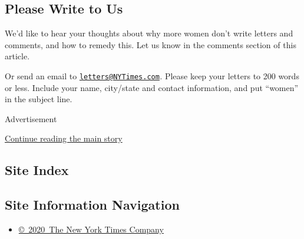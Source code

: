 \hypertarget{please-write-to-us}{%
\subsection{Please Write to Us}\label{please-write-to-us}}

We'd like to hear your thoughts about why more women don't write letters
and comments, and how to remedy this. Let us know in the comments
section of this article.

Or send an email to
\href{mailto:letters@NYTimes.com}{\nolinkurl{letters@NYTimes.com}}\emph{.}
Please keep your letters to 200 words or less. Include your name,
city/state and contact information, and put ``women'' in the subject
line.

Advertisement

\protect\hyperlink{after-bottom}{Continue reading the main story}

\hypertarget{site-index}{%
\subsection{Site Index}\label{site-index}}

\hypertarget{site-information-navigation}{%
\subsection{Site Information
Navigation}\label{site-information-navigation}}

\begin{itemize}
\tightlist
\item
  \href{https://help.nytimes3xbfgragh.onion/hc/en-us/articles/115014792127-Copyright-notice}{©~2020~The
  New York Times Company}
\end{itemize}


